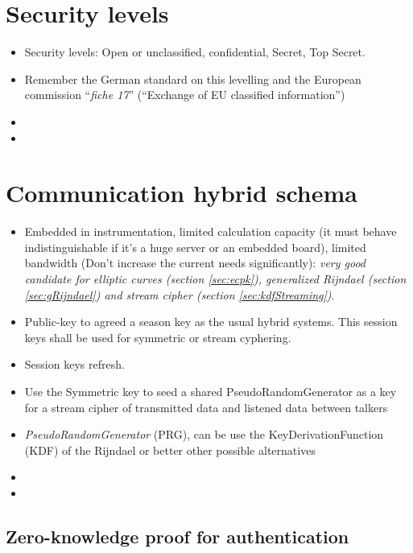\documentclass[10pt,a4paper,twoside]{llncs}
\begin{document}
%
\section{Security levels \label{sec:secLevel}}

\begin{itemize}
    \item Security levels: Open or unclassified, confidential, Secret, Top Secret.
    \item Remember the German standard on this levelling and the European commission ``\emph{fiche 17}'' \cite{fiche17EU}(``Exchange of EU classified information'')
    \item
    \item
\end{itemize}

%
\section{Communication hybrid schema \label{sec:intercom}}

\begin{itemize}
    \item Embedded in instrumentation, limited calculation capacity (it must behave indistinguishable if it's a huge server or an embedded board), limited bandwidth (Don't increase the current needs significantly): \emph{very good candidate for elliptic curves (section \ref{sec:ecpk}), generalized Rijndael (section \ref{sec:gRijndael}) and stream cipher (section \ref{sec:kdfStreaming})}.
    \item Public-key to agreed a season key as the usual hybrid systems. This session keys shall be used for symmetric or stream cyphering.
    \item Session keys refresh.
    \item Use the Symmetric key to seed a shared PseudoRandomGenerator as a key for a stream cipher of transmitted data and listened data between talkers
    \item \emph{PseudoRandomGenerator} (PRG), can be use the KeyDerivationFunction (KDF) of the Rijndael or better other possible alternatives
    \item 
    \item 
\end{itemize}

%
\subsection{Zero-knowledge proof for authentication \label{sec:auth}}
\end{document}

